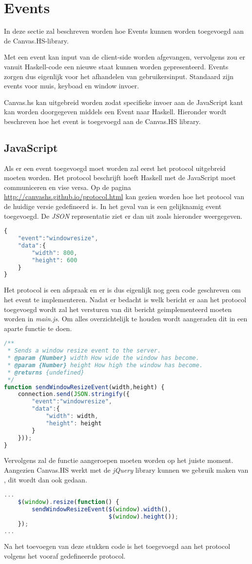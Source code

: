 \section{Events}
In deze sectie zal beschreven worden hoe Events kunnen worden toegevoegd aan de Canvas.HS-library.

Met een event kan input van de client-side worden afgevangen, vervolgens zou er vanuit Haskell-code een nieuwe staat kunnen worden gepresenteerd. Events zorgen dus eigenlijk voor het afhandelen van gebruikersinput. Standaard zijn events voor muis, keyboad en window invoer.

Canvas.hs kan uitgebreid worden zodat specifieke invoer aan de JavaScript kant kan worden doorgegeven middels een Event naar Haskell. Hieronder wordt beschreven hoe het  event is toegevoegd aan de Canvas.HS library.
\subsection{JavaScript}
Als er een event toegevoegd moet worden zal eerst het protocol uitgebreid moeten worden. Het protocol beschrijft hoeft Haskell met de JavaScript moet communiceren en vise versa. Op de pagina \url{http://canvashs.github.io/protocol.html} kan gezien worden hoe het protocol van de huidige versie gedefineerd is. In het geval van  is een gelijknamig event toegevoegd. De \emph{JSON} representatie ziet er dan uit zoals hieronder weergegeven.
\begin{lstlisting}[language=JavaScript]
{
    "event":"windowresize",
    "data":{
        "width": 800,
        "height": 600
    }
}
\end{lstlisting}
Het protocol is een afspraak en er is dus eigenlijk nog geen code geschreven om het event te implementeren. Nadat er bedacht is welk bericht er aan het protocol toegevoegd wordt zal het versturen van dit bericht geimplementeerd moeten worden in \emph{main.js}. Om alles overzichtelijk te houden wordt aangeraden dit in een aparte functie te doen.
\begin{lstlisting}[language=JavaScript]
/**
 * Sends a window resize event to the server.
 * @param {Number} width How wide the window has become.
 * @param {Number} height How high the window has become.
 * @returns {undefined}
 */
function sendWindowResizeEvent(width,height) {
    connection.send(JSON.stringify({
        "event":"windowresize",
        "data":{
            "width": width,
            "height": height
        }
    }));
}
\end{lstlisting}
Vervolgens zal de functie  aangeroepen moeten worden op het juiste moment. Aangezien Canvas.HS werkt met de \emph{jQuery} library kunnen we gebruik maken van , dit wordt dan ook gedaan.
\begin{lstlisting}[language=JavaScript]
...
    $(window).resize(function() {
        sendWindowResizeEvent($(window).width(),
        					  $(window).height());
    });
...
\end{lstlisting}
Na het toevoegen van deze stukken code is het  toegevoegd aan het protocol volgens het vooraf gedefineerde protocol.
